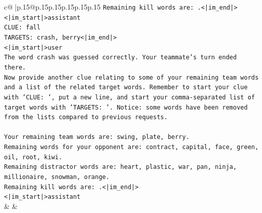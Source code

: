\documentclass{article}
\begin{document}
{\begin{supertabular}{c@{$\;$}|p{.15\linewidth}@{}p{.15\linewidth}p{.15\linewidth}p{.15\linewidth}p{.15\linewidth}p{.15\linewidth}}
{{{\texttt{Remaining kill words are: .<|im\_end|>} \\
\texttt{<|im\_start|>assistant} \\
\texttt{CLUE: fall} \\
\texttt{TARGETS: crash, berry<|im\_end|>} \\
\texttt{<|im\_start|>user} \\
\texttt{The word crash was guessed correctly. Your teammate's turn ended there.} \\
\texttt{Now provide another clue relating to some of your remaining team words and a list of the related target words. Remember to start your clue with 'CLUE: ', put a new line, and start your comma{-}separated list of target words with 'TARGETS: '. Notice: some words have been removed from the lists compared to previous requests.} \\
\\ 
\texttt{Your remaining team words are: swing, plate, berry.} \\
\texttt{Remaining words for your opponent are: contract, capital, face, green, oil, root, kiwi.} \\
\texttt{Remaining distractor words are: heart, plastic, war, pan, ninja, millionaire, snowman, orange.} \\
\texttt{Remaining kill words are: .<|im\_end|>} \\
\texttt{<|im\_start|>assistant} \\
            }
        }
    }
    & & \\ \\


\end{supertabular}}
\end{document}
